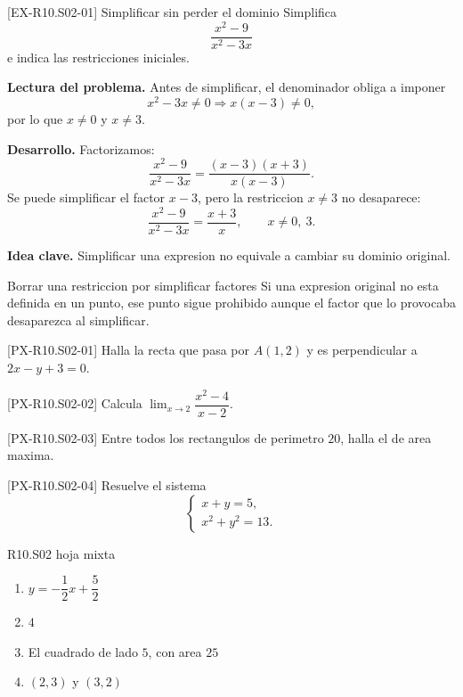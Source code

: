\begin{solvedexample}{[EX-R10.S02-01] Simplificar sin perder el dominio}
Simplifica
\[
\frac{x^2-9}{x^2-3x}
\]
e indica las restricciones iniciales.

\textbf{Lectura del problema.} Antes de simplificar, el denominador obliga a imponer
\[
x^2-3x\neq 0 \Longrightarrow x(x-3)\neq 0,
\]
por lo que \(x\neq 0\) y \(x\neq 3\).

\textbf{Desarrollo.} Factorizamos:
\[
\frac{x^2-9}{x^2-3x}=\frac{(x-3)(x+3)}{x(x-3)}.
\]
Se puede simplificar el factor \(x-3\), pero la restriccion \(x\neq 3\) no desaparece:
\[
\frac{x^2-9}{x^2-3x}=\frac{x+3}{x},\qquad x\neq 0,\ 3.
\]

\textbf{Idea clave.} Simplificar una expresion no equivale a cambiar su dominio original.
\end{solvedexample}

\begin{commonerror}{Borrar una restriccion por simplificar factores}
Si una expresion original no esta definida en un punto, ese punto sigue prohibido aunque el
factor que lo provocaba desaparezca al simplificar.
\end{commonerror}

\begin{exercise}{[PX-R10.S02-01] Halla la recta que pasa por \(A(1,2)\) y es perpendicular a
\(2x-y+3=0\).}
\end{exercise}

\begin{exercise}{[PX-R10.S02-02] Calcula \(\lim_{x\to 2}\dfrac{x^2-4}{x-2}\).}
\end{exercise}

\begin{exercise}{[PX-R10.S02-03] Entre todos los rectangulos de perimetro \(20\), halla el de
area maxima.}
\end{exercise}

\begin{exercise}{[PX-R10.S02-04] Resuelve el sistema
\[
\begin{cases}
x+y=5,\\
x^2+y^2=13.
\end{cases}
\]}
\end{exercise}

\begin{shortanswer}{R10.S02 hoja mixta}
\begin{enumerate}[label=\textbf{PX-R10.S02-\arabic*:}, leftmargin=*]
  \item \(y=-\dfrac{1}{2}x+\dfrac{5}{2}\)
  \item \(4\)
  \item El cuadrado de lado \(5\), con area \(25\)
  \item \((2,3)\) y \((3,2)\)
\end{enumerate}
\end{shortanswer}

